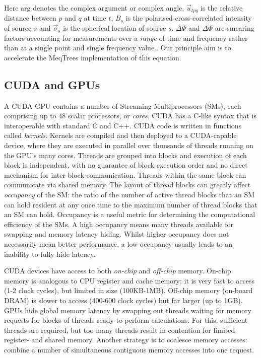 Here $\mbox{arg}$ denotes the complex argument or complex angle,
$\vec{u}_{tpq}$ is the relative distance between $p$ and $q$ at time $t$,
$B_s$ is the polarised cross-correlated intensity of source $s$ and
$\vec\sigma_s$ is the spherical location of source $s$. $\Delta\Psi$ and
$\Delta\Phi$ are smearing factors accounting for measurements over a
\emph{range} of time and frequency rather than at a single point and single
frequency value.\citep{Smirnov2011, Taylor1999}. Our principle
aim is to accelerate the MeqTrees implementation of this equation.



\subsection{CUDA and GPUs}

A CUDA GPU contains a number of Streaming Multiprocessors (SMs), each
comprising up to 48 scalar processors, or \emph{cores}.   CUDA has a C-like
syntax that is interoperable with standard C and C++. CUDA code is written in
functions called \emph{kernels}.  Kernels are compiled and then deployed to a
CUDA-capable device, where they are executed in parallel over thousands of
threads running on the GPU's many cores.   Threads are grouped into blocks and
execution of each block is independent, with no guarantee of block execution
order and no direct mechanism for inter-block communication. Threads within
the same block can communicate via shared memory.  The layout of thread blocks
can greatly affect \emph{occupancy} of the SM: the ratio of the number of
active thread blocks that an SM can hold resident at any once time to the
maximum number of thread blocks that an SM can hold. Occupancy is a useful
metric for determining the computational efficiency of the SMs. A high
occupancy means many threads available  for swapping and memory latency
hiding. Whilst higher occupancy does not necessarily mean better performance,
a low occupancy usually leads to an inability to fully hide latency.

CUDA devices have access to both \emph{on-chip} and \emph{off-chip} memory.
On-chip memory is analogous to CPU register and cache memory: it is very fast
to access (1-2 clock cycles), but limited in size (100KB-1MB). Off-chip memory
(on-board DRAM) is slower to access (400-600 clock cycles) but far larger (up
to 1GB). GPUs hide global memory latency by swapping out threads
waiting for memory requests for blocks of threads ready to perform
calculations. For this, sufficient threads are required, but too
many threads result in contention for limited register- and shared memory.
Another strategy is to coalesce memory accesses:  combine a number of
simultaneous contiguous memory accesses into one request.




